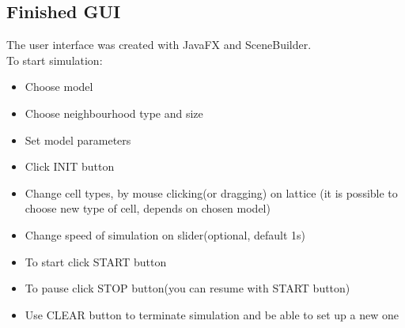 \documentclass[a4paper, 11pt]{article}
\begin{document}
\subsection{Finished GUI}
The user interface was created with JavaFX and SceneBuilder.\\
To start simulation:
\begin{itemize}
\item Choose model
\item Choose neighbourhood type and size
\item Set model parameters
\item Click INIT button
\item Change cell types, by mouse clicking(or dragging) on lattice (it is possible to choose new type of cell, depends on chosen model)
\item Change speed of simulation on slider(optional, default 1s)
\item To start click START button
\item To pause click STOP button(you can resume with START button)
\item Use CLEAR button to terminate simulation and be able to set up a new one

\end{itemize}
\end{document}

